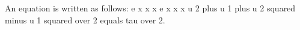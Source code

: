 An equation is written as follows:
e x x x e x x x u 2 plus u 1 plus u 2 squared minus u 1 squared over 2 equals tau over 2.